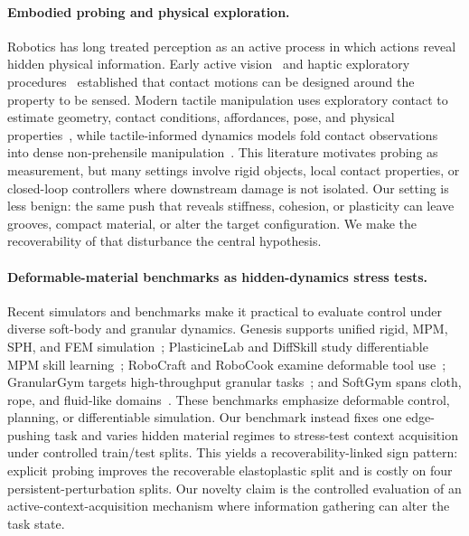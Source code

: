 \paragraph{Embodied probing and physical exploration.}
Robotics has long treated perception as an active process in which actions reveal hidden physical information. Early active vision~\cite{bajcsy1988active} and haptic exploratory procedures~\cite{lederman1987hand} established that contact motions can be designed around the property to be sensed. Modern tactile manipulation uses exploratory contact to estimate geometry, contact conditions, affordances, pose, and physical properties~\cite{calandra2018more,xu2013tactile,bauza2020tactile,yu2016more,bauza2018data,dutta2025predictive}, while tactile-informed dynamics models fold contact observations into dense non-prehensile manipulation~\cite{ai2024robopack}. This literature motivates probing as measurement, but many settings involve rigid objects, local contact properties, or closed-loop controllers where downstream damage is not isolated. Our setting is less benign: the same push that reveals stiffness, cohesion, or plasticity can leave grooves, compact material, or alter the target configuration. We make the recoverability of that disturbance the central hypothesis.

\paragraph{Deformable-material benchmarks as hidden-dynamics stress tests.}
Recent simulators and benchmarks make it practical to evaluate control under diverse soft-body and granular dynamics. Genesis supports unified rigid, MPM, SPH, and FEM simulation~\cite{genesis2024}; PlasticineLab and DiffSkill study differentiable MPM skill learning~\cite{huang2022plasticinelab,lin2022diffskill}; RoboCraft and RoboCook examine deformable tool use~\cite{shi2022robocraft,shi2023robocook}; GranularGym targets high-throughput granular tasks~\cite{millard2023granulargym}; and SoftGym spans cloth, rope, and fluid-like domains~\cite{lin2021softgym}. These benchmarks emphasize deformable control, planning, or differentiable simulation. Our benchmark instead fixes one edge-pushing task and varies hidden material regimes to stress-test context acquisition under controlled train/test splits. This yields a recoverability-linked sign pattern: explicit probing improves the recoverable elastoplastic split and is costly on four persistent-perturbation splits. Our novelty claim is the controlled evaluation of an active-context-acquisition mechanism where information gathering can alter the task state.
